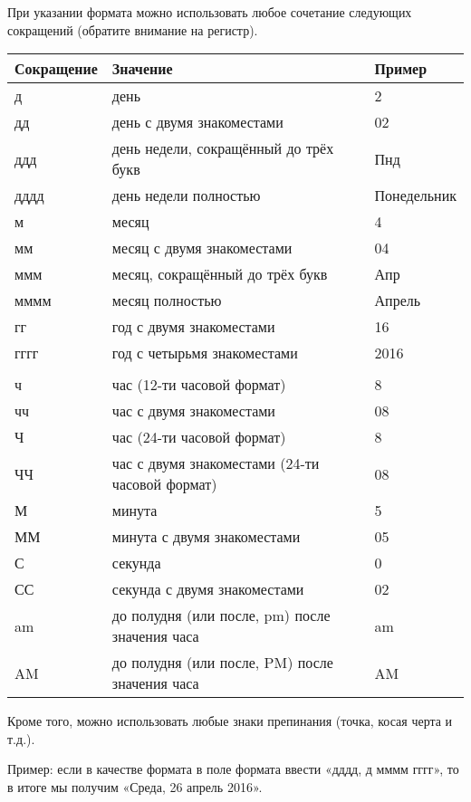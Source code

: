 ﻿\documentclass[a4paper,10pt]{article}
\begin{document}
При указании формата можно использовать любое сочетание следующих сокращений (обратите внимание на регистр).

\begin{center}
\begin{tabular}{ | m{} | m{8cm} |  m{3cm} |}
\hline
 \textbf{Сокращение} & \textbf{Значение} & \textbf{Пример}\\ 
 \hline
 д & день & 2\\
\hline
 дд & день с двумя знакоместами & 02\\
\hline
 ддд & день недели, сокращённый до трёх букв& Пнд\\
\hline
 дддд & день недели полностью & Понедельник\\
\hline
 м & месяц & 4\\
\hline
 мм & месяц с двумя знакоместами & 04\\
\hline
 ммм & месяц, сокращённый до  трёх букв & Апр\\
\hline
 мммм & месяц полностью & Апрель\\
\hline
 гг & год с двумя знакоместами & 16\\
\hline
 гггг & год с четырьмя знакоместами & 2016\\
\hline
  &  & \\
\hline
 ч & час (12-ти часовой формат) & 8\\
\hline
 чч & час с двумя знакоместами & 08\\
\hline
 Ч & час (24-ти часовой формат) & 8\\
\hline
 ЧЧ & час с двумя знакоместами (24-ти часовой формат) & 08\\
\hline
 М & минута & 5\\
\hline
 ММ & минута с двумя знакоместами & 05\\
\hline
 С & секунда & 0\\
\hline
 СС & секунда с двумя знакоместами & 02\\
\hline
 am & до полудня (или после, pm) после значения часа & am\\
\hline
AM & до полудня (или после, PM) после значения часа & AM\\
\hline
\end{tabular}
\end{center}

Кроме того, можно использовать любые знаки препинания (точка, косая черта и т.д.).

Пример: если в качестве формата в поле формата ввести «дддд, д мммм гггг», то в итоге мы получим «Среда, 26 апрель 2016».
\end{document}
